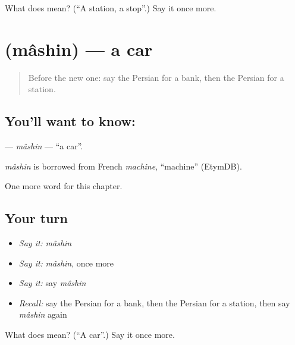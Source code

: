 \begin{tcolorbox}[breakable,colback=teal!4,colframe=teal!35!black,title={Before you move on}]
What does  mean? (\textquotedblleft{}A station, a stop\textquotedblright{}.) Say it once more.
\end{tcolorbox}
\section[\texorpdfstring{\fa{ماشین} (mâshin)}{ماشین (mâshin)}]{ (mâshin) — a car}

\label{lesson:FA-C70-mashin}



\begin{quote}
Before the new one: say the Persian for a bank, then the Persian for a station.
\end{quote}

\subsection*{You'll want to know: }
\textbf{} — \emph{mâshin} — \textquotedblleft{}a car\textquotedblright{}.

\begin{cousinweb}
\emph{mâshin} is borrowed from French \emph{machine}, \textquotedblleft{}machine\textquotedblright{} (EtymDB).
\end{cousinweb}

\begin{grammarlens}[title={What you've built}]
One more word for this chapter.
\end{grammarlens}

\subsection*{Your turn}
\begin{itemize}
\raggedright
  \item \emph{Say it:} \emph{mâshin}
  \item \emph{Say it:} \emph{mâshin}, once more
  \item \emph{Say it:} say \emph{mâshin}
  \item \emph{Recall:} say the Persian for a bank, then the Persian for a station, then say \emph{mâshin} again
\end{itemize}

\begin{tcolorbox}[breakable,colback=teal!4,colframe=teal!35!black,title={Before you move on}]
What does  mean? (\textquotedblleft{}A car\textquotedblright{}.) Say it once more.
\end{tcolorbox}
